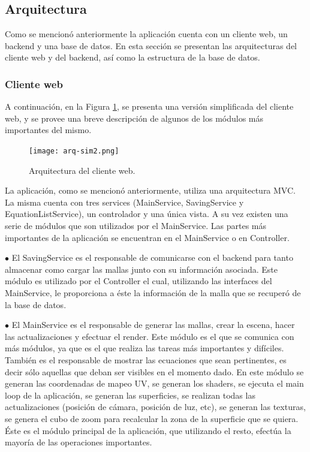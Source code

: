 \documentclass[12pt]{article}
\begin{document}
\clearpage
\subsection{Arquitectura}
\noindent Como se mencionó anteriormente la aplicación cuenta con un cliente web, un backend y una base de datos. En esta sección se presentan las arquitecturas del cliente web y del backend, así como la estructura de la base de datos.
\subsubsection{Cliente web}
\noindent A continuación, en la Figura \ref{arq}, se presenta una versión simplificada del cliente web, y se provee una breve descripción de algunos de los módulos más importantes del mismo.\\
\begin{figure}[h!]
\texttt{[image: arq-sim2.png]}
\caption{Arquitectura del cliente web.}
\label{arq}
\end{figure}
La aplicación, como se mencionó anteriormente, utiliza una arquitectura MVC. La misma  cuenta con tres services (MainService, SavingService y EquationListService), un controlador y una única vista. A su vez existen una serie de módulos que son utilizados por el MainService. Las partes más importantes de la aplicación se encuentran en el MainService o en Controller.

$\bullet$ El SavingService es el responsable de comunicarse con el backend para tanto almacenar como cargar las mallas junto con su información asociada. Este módulo es utilizado por el Controller el cual, utilizando las interfaces del MainService, le proporciona a éste la información de la malla que se recuperó de la base de datos.

$\bullet$ El MainService es el responsable de generar las mallas, crear la escena, hacer las actualizaciones y efectuar el render. Este módulo es el que se comunica con más módulos, ya que es el que realiza las tareas más importantes y difíciles. También es el responsable de mostrar las ecuaciones que sean pertinentes, es decir sólo aquellas que deban ser visibles en el momento dado. En este módulo se generan las coordenadas de mapeo UV, se generan los shaders, se ejecuta el main loop de la aplicación, se generan las superficies, se realizan todas las actualizaciones (posición de cámara, posición de luz, etc), se generan las texturas, se genera el cubo de zoom para recalcular la zona de la superficie que se quiera. Éste es el módulo principal de la aplicación, que utilizando el resto, efectúa la mayoría de las operaciones importantes.
\end{document}
